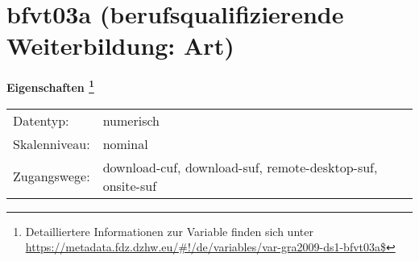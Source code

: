 
    \setcounter{footnote}{0}

    \vspace*{-1.8cm}
	\section{bfvt03a (berufsqualifizierende Weiterbildung: Art)}
	\label{section:bfvt03a}



    \vspace*{0.5cm}
    \noindent\textbf{Eigenschaften
	\footnote{Detailliertere Informationen zur Variable finden sich unter
		\url{https://metadata.fdz.dzhw.eu/\#!/de/variables/var-gra2009-ds1-bfvt03a$}}}\\
	\begin{tabularx}{\hsize}{@{}lX}
	Datentyp: & numerisch \\
	Skalenniveau: & nominal \\
	Zugangswege: &
	  download-cuf, 
	  download-suf, 
	  remote-desktop-suf, 
	  onsite-suf
 \\
    \end{tabularx}



